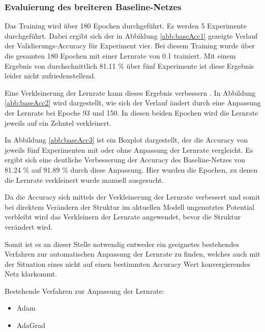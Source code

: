 \subsubsection{Evaluierung des breiteren Baseline-Netzes}
Das Training wird über 180 Epochen durchgeführt. Es werden 5 Experimente durchgeführt. Dabei ergibt sich der in Abbildung \ref{abb:baseAcc1} gezeigte Verlauf der Validierungs-Accuracy für Experiment vier. Bei diesem Training wurde über die gesamten 180 Epochen mit einer Lernrate von 0.1 trainiert. Mit einem Ergebnis von durchschnittlich 81.11 \% über fünf Experimente ist diese Ergebnis leider nicht zufriedenstellend. 

Eine Verkleinerung der Lernrate kann dieses Ergebnis verbessern \cite{CNNBook}. In Abbildung \ref{abb:baseAcc2} wird dargestellt, wie sich der Verlauf ändert durch eine Anpassung der Lernrate bei Epoche 93 und 150. In diesen beiden Epochen wird die Lernrate jeweils auf ein Zehntel verkleinert. 

In Abbildung \ref{abb:baseAcc3} ist ein Boxplot dargestellt, der die Accuracy von jeweils fünf Experimenten mit oder ohne Anpassung der Lernrate vergleicht. Es ergibt sich eine deutliche Verbesserung der Accuracy des Baseline-Netzes von 81.24 \% auf 91.89 \% durch diese Anpassung. 
\color{blue1}
Hier wurden die Epochen, zu denen die Lernrate verkleinert wurde manuell ausgesucht. 


Da die Accuracy sich mittels der Verkleinerung der Lernrate verbessert und somit bei direktem Verändern der Struktur im aktuellen Modell ungenutztes Potential verbleibt wird das Verkleinern der Lernrate angewendet, bevor die Struktur verändert wird.


Somit ist es an dieser Stelle notwendig entweder ein geeignetes bestehendes Verfahren zur automatischen Anpassung der Lernrate zu finden, welches auch mit der Situation eines nicht auf einen bestimmten Accuracy Wert konvergierendes Netz klarkommt. 

Bestehende Verfahren zur Anpassung der Lernrate:
\begin{itemize}
 \item Adam
 \item AdaGrad
\end{itemize}




\color{black}

